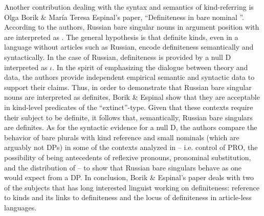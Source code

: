 \documentclass[output=paper]{langsci/langscibook}
\begin{document}
Another contribution dealing with the syntax and semantics of kind-referring  is Olga Borik \& María Teresa Espinal’s paper, “Definiteness in  bare nominal ”. According to the authors, Russian bare singular nouns in argument position with  are interpreted as . The general hypothesis is that definite kinds, even in a language without articles such as Russian, encode definiteness semantically and syntactically. In the case of Russian, definiteness is provided by a null D interpreted as $\iota$. In the spirit of emphasizing the dialogue between theory and data, the authors provide independent empirical semantic and syntactic data to support their claims. Thus, in order to demonstrate that Russian bare singular nouns are interpreted as definites, Borik \& Espinal show that they are acceptable in kind-level predicates of the ``extinct''-type. Given that these contexts require their subject to be definite, it follows that, semantically, Russian bare singulars are definites. As for the syntactic evidence for a null D, the authors compare the behavior of bare plurals with kind reference and small nominals (which are arguably not DPs) in some of the contexts analyzed in \citet{Pereltsvaig2006} -- i.e. control of PRO, the possibility of being antecedents of reflexive pronouns, pronominal substitution, and the distribution of  -- to show that Russian bare singulars behave as one would expect from a DP. In conclusion, Borik \& Espinal’s paper deals with two of the subjects that has long interested linguist working on definiteness: reference to kinds and its links to definiteness and the locus of definiteness in article-less languages. 
\end{document}
